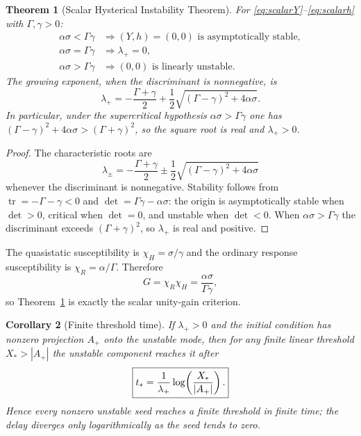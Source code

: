 \documentclass[11pt]{article}
\newtheorem{theorem}{Theorem}[section]
\newtheorem{corollary}[theorem]{Corollary}
\theoremstyle{definition}
\theoremstyle{remark}
\begin{document}
\begin{theorem}[Scalar Hysterical Instability Theorem]\label{thm:scalar}
For \eqref{eq:scalarY}--\eqref{eq:scalarh} with $\Gamma,\gamma>0$:
\begin{align}
 \alpha\sigma<\Gamma\gamma &\Longrightarrow (Y,h)=(0,0)\text{ is asymptotically stable},\\
 \alpha\sigma=\Gamma\gamma &\Longrightarrow \lambda_+=0,\\
 \alpha\sigma>\Gamma\gamma &\Longrightarrow (0,0)\text{ is linearly unstable}.
\end{align}
The growing exponent, when the discriminant is nonnegative, is
\begin{equation}
 \boxed{\lambda_+=-\frac{\Gamma+\gamma}{2}
 +\frac12\sqrt{(\Gamma-\gamma)^2+4\alpha\sigma}.}
 \label{eq:lplus}
\end{equation}
In particular, under the supercritical hypothesis $\alpha\sigma>\Gamma\gamma$ one has $(\Gamma-\gamma)^2+4\alpha\sigma>(\Gamma+\gamma)^2$, so the square root is real and $\lambda_+>0$.
\end{theorem}
\begin{proof}
The characteristic roots are
\begin{equation}
 \lambda_{\pm}=-\frac{\Gamma+\gamma}{2}
 \pm\frac12\sqrt{(\Gamma-\gamma)^2+4\alpha\sigma}
\end{equation}
whenever the discriminant is nonnegative.
Stability follows from $\operatorname{tr}=-\Gamma-\gamma<0$ and $\det=\Gamma\gamma-\alpha\sigma$: the origin is asymptotically stable when $\det>0$, critical when $\det=0$, and unstable when $\det<0$.
When $\alpha\sigma>\Gamma\gamma$ the discriminant exceeds $(\Gamma+\gamma)^2$, so $\lambda_+$ is real and positive.
\end{proof}

The quasistatic susceptibility is $\chi_H=\sigma/\gamma$ and the ordinary response susceptibility is $\chi_R=\alpha/\Gamma$.  Therefore
\begin{equation}
 \boxed{G=\chi_R\chi_H=\frac{\alpha\sigma}{\Gamma\gamma},}
\end{equation}
so Theorem~\ref{thm:scalar} is exactly the scalar unity-gain criterion.

\begin{corollary}[Finite threshold time]\label{cor:threshold}
If $\lambda_+>0$ and the initial condition has nonzero projection $A_+$ onto the unstable mode, then for any finite linear threshold $X_*>|A_+|$ the unstable component reaches it after
\begin{equation}
 \boxed{t_*={1\over\lambda_+}\log\!\left({X_*\over |A_+|}\right).}
\end{equation}
Hence every nonzero unstable seed reaches a finite threshold in finite time; the delay diverges only logarithmically as the seed tends to zero.
\end{corollary}
\end{document}
